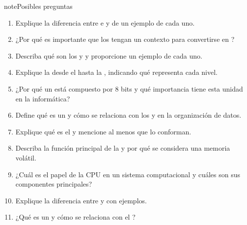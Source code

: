 \documentclass[letterpaper,10pt,spanish]{sphinxmanual}
\begin{document}
\begin{sphinxadmonition}{note}{Posibles preguntas}
\begin{enumerate}
%
\item {} 
\sphinxAtStartPar
Explique la diferencia entre  e  y de un ejemplo de cada uno.

\item {} 
\sphinxAtStartPar
¿Por qué es importante que los  tengan un contexto para convertirse en ?

\item {} 
\sphinxAtStartPar
Describa qué son los  y  y proporcione un ejemplo de cada uno.

\item {} 
\sphinxAtStartPar
Explique la  desde el  hasta la , indicando qué representa cada nivel.

\item {} 
\sphinxAtStartPar
¿Por qué un  está compuesto por 8 bits y qué importancia tiene esta unidad en la informática?

\item {} 
\sphinxAtStartPar
Define qué es un  y cómo se relaciona con los  y  en la organización de datos.

\item {} 
\sphinxAtStartPar
Explique qué es el  y mencione al menos  que lo conforman.

\item {} 
\sphinxAtStartPar
Describa la función principal de la  y por qué se considera una memoria volátil.

\item {} 
\sphinxAtStartPar
¿Cuál es el papel de la CPU en un sistema computacional y cuáles son sus componentes principales?

\item {} 
\sphinxAtStartPar
Explique la diferencia entre  y  con ejemplos.

\item {} 
\sphinxAtStartPar
¿Qué es un  y cómo se relaciona con el ?


\end{enumerate}
\end{sphinxadmonition}
\end{document}
